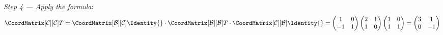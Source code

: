 \begin{example}
    \textit{Step 4 --- Apply the formula}:
    \[
        \CoordMatrix[\mathcal{C}][\mathcal{C}]{T}
        = \CoordMatrix[\mathcal{B}][\mathcal{C}]{\Identity{}}
          \cdot \CoordMatrix[\mathcal{B}][\mathcal{B}]{T}
          \cdot \CoordMatrix[\mathcal{C}][\mathcal{B}]{\Identity{}}
        = \begin{pmatrix} 1 & 0 \\ -1 & 1 \end{pmatrix}
          \begin{pmatrix} 2 & 1 \\ 1 & 0 \end{pmatrix}
          \begin{pmatrix} 1 & 0 \\ 1 & 1 \end{pmatrix}
        = \begin{pmatrix} 3 & 1 \\ 0 & -1 \end{pmatrix}
    \]


\end{example}
